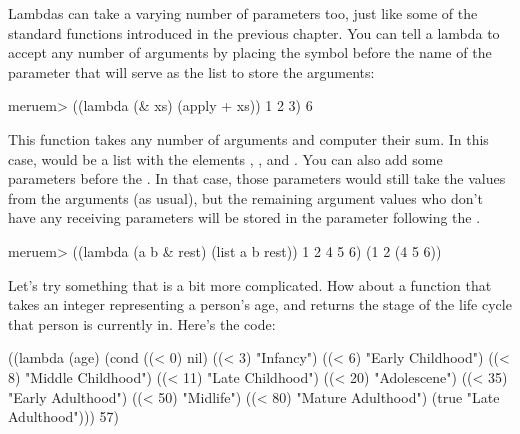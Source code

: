 Lambdas can take a varying number of parameters too, just like some of the standard functions introduced in the previous chapter. You can tell a lambda to accept any number of arguments by placing the \code{\&} symbol before the name of the parameter that will serve as the list to store the arguments:

\begin{REPL}
meruem> ((lambda (& xs) (apply + xs)) 1 2 3)
6
\end{REPL}

This function takes any number of arguments and computer their sum. In this case,  would be a list with the elements , , and . You can also add some parameters before the \code{\&}. In that case, those parameters would still take the values from the arguments (as usual), but the remaining argument values who don't have any receiving parameters will be stored in the parameter following the \code{\&}. 

\begin{REPL}
meruem> ((lambda (a b & rest) (list a b rest)) 1 2 4 5 6)
(1 2 (4 5 6))
\end{REPL}


Let's try something that is a bit more complicated. How about a function that takes an integer representing a person's age, and returns the stage of the life cycle that person is currently in. Here's the code:

\begin{Meruem}
((lambda (age)
   (cond 
     ((< 0) nil)
     ((< 3) "Infancy")
     ((< 6) "Early Childhood")
     ((< 8) "Middle Childhood")
     ((< 11) "Late Childhood")
     ((< 20) "Adolescene")
     ((< 35) "Early Adulthood")
     ((< 50) "Midlife")
     ((< 80) "Mature Adulthood")
     (true "Late Adulthood"))) 57)
\end{Meruem}